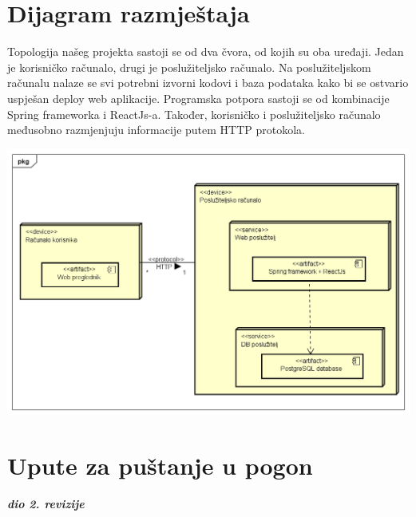		 
			
			\eject 
		
		
		\section{Dijagram razmještaja}
			
			
			
			\text Topologija našeg projekta sastoji se od dva čvora, od kojih su oba uređaji. Jedan je korisničko računalo, drugi je poslužiteljsko računalo. Na poslužiteljskom računalu nalaze se svi potrebni izvorni kodovi i baza podataka kako bi se ostvario uspješan deploy web aplikacije. Programska potpora sastoji se od kombinacije Spring frameworka i ReactJs-a. Također, korisničko i poslužiteljsko računalo međusobno razmjenjuju informacije putem HTTP protokola.
			
			\includegraphics[scale=0.5]{dijagrami/Dijagram razmjestaja.png}
			
			\eject 
		
		\section{Upute za puštanje u pogon}
		
			\textbf{\textit{dio 2. revizije}}\\
		
